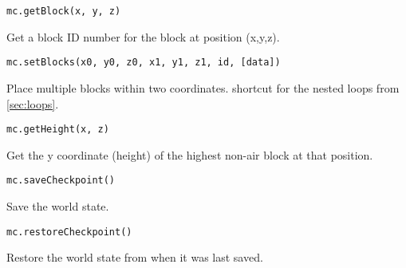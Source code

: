 \begin{appendices}
			\begin{lstlisting}[style=Python, numbers=none]
mc.getBlock(x, y, z)
			\end{lstlisting}
			\vspace{-8pt}
			Get a block ID number for the block at position (x,y,z).
			\vspace{8pt}
		
			\begin{lstlisting}[style=Python, numbers=none]
mc.setBlocks(x0, y0, z0, x1, y1, z1, id, [data])
			\end{lstlisting}			
			\vspace{-8pt}
			Place multiple blocks within two coordinates. shortcut for the nested loops from \autoref{sec:loops}.
			\vspace{8pt}
			
			\begin{lstlisting}[style=Python, numbers=none]
mc.getHeight(x, z)
			\end{lstlisting}
			\vspace{-8pt}
			Get the y coordinate (height) of the highest non-air block at that position.
			\vspace{8pt}
			
			\begin{lstlisting}[style=Python, numbers=none]
mc.saveCheckpoint()
			\end{lstlisting}
			\vspace{-8pt}
			Save the world state.
			\vspace{8pt}
			
			\begin{lstlisting}[style=Python, numbers=none]
mc.restoreCheckpoint()
			\end{lstlisting}
			\vspace{-8pt}
			Restore the world state from when it was last saved.
			\vspace{8pt}
			

\iffalse			
		\section{Function quick-reference}
		
		for a full listing see \href{http://www.stuffaboutcode.com/p/minecraft-api-reference.html}{www.stuffaboutcode.com/p/minecraft-api-reference.html}
			
			\begin{lstlisting}[style=Python, numbers=none]
mc.getBlock(x, y, z)
			\end{lstlisting}
		
			\begin{lstlisting}[style=Python, numbers=none]
mc.getBlockWithData(x, y, z)
			\end{lstlisting}
			
			\begin{lstlisting}[style=Python, numbers=none]
mc.setBlock(x, y, z, id, [data])
			\end{lstlisting}
\fi
		
	\end{appendices}
	
	
